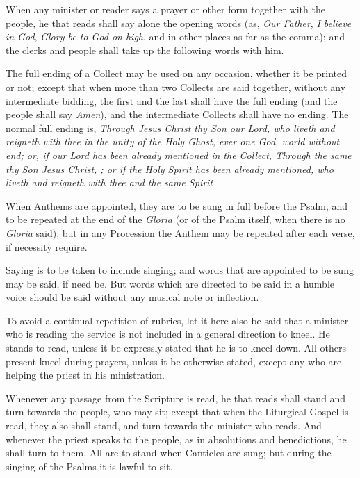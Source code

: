 When any minister or reader says a prayer or other form together with the people, he that reads shall say alone the opening words (as, \emph{Our Father}, \emph{I believe in God}, \emph{Glory be to God on high}, and in other places as far as the comma); and the clerks and people shall take up the following words with him.

The full ending of a Collect may be used on any occasion, whether it be printed or not; except that when more than two Collects are said together, without any intermediate bidding, the first and the last shall have the full ending (and the people shall say \emph{Amen}), and the intermediate Collects shall have no ending. The normal full ending is, \emph{Through Jesus Christ thy Son our Lord, who liveth and reigneth with thee in the unity of the Holy Ghost, ever one God, world without end; \emph{or, if our Lord has been already mentioned in the Collect,} Through the same thy Son Jesus Christ, \etc; \emph{or if the Holy Spirit has been already mentioned,} who liveth and reigneth with thee and the same Spirit \etc}


When Anthems are appointed, they are to be sung in full before the Psalm, and to be repeated at the end of the \emph{Gloria} (or of the Psalm itself, when there is no \emph{Gloria} said); but in any Procession the Anthem may be repeated after each verse, if necessity require.

Saying is to be taken to include singing; and words that are appointed to be sung may be said, if need be. But words which are directed to be said in a humble voice should be said without any musical note or inflection.


To avoid a continual repetition of rubrics, let it here also be said that a minister who is reading the service is not included in a general direction to kneel. He stands to read, unless it be expressly stated that he is to kneel down. All others present kneel during prayers, unless it be otherwise stated, except any who are helping the priest in his ministration.

Whenever any passage from the Scripture is read, he that reads shall stand and turn towards the people, who may sit; except that when the Liturgical Gospel is read, they also shall stand, and turn towards the minister who reads. And whenever the priest speaks to the people, as in absolutions and benedictions, he shall turn to them. All are to stand when Canticles are sung; but during the singing of the Psalms it is lawful to sit.

